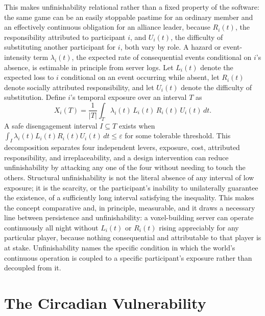 This makes unfinishability relational rather than a fixed property of the software: the same game can be an easily stoppable pastime for an ordinary member and an effectively continuous obligation for an alliance leader, because $R_i(t)$, the responsibility attributed to participant $i$, and $U_i(t)$, the difficulty of substituting another participant for $i$, both vary by role. A hazard or event-intensity term $\lambda_i(t)$, the expected rate of consequential events conditional on $i$'s absence, is estimable in principle from server logs. Let $L_i(t)$ denote the expected loss to $i$ conditional on an event occurring while absent, let $R_i(t)$ denote socially attributed responsibility, and let $U_i(t)$ denote the difficulty of substitution. Define $i$'s temporal exposure over an interval $T$ as
\[
X_i(T) = \frac{1}{|T|} \int_T \lambda_i(t)\, L_i(t)\, R_i(t)\, U_i(t)\, dt.
\]
A safe disengagement interval $I \subseteq T$ exists when $\int_I \lambda_i(t) L_i(t) R_i(t) U_i(t)\, dt \leq \varepsilon$ for some tolerable threshold. This decomposition separates four independent levers, exposure, cost, attributed responsibility, and irreplaceability, and a design intervention can reduce unfinishability by attacking any one of the four without needing to touch the others. Structural unfinishability is not the literal absence of any interval of low exposure; it is the scarcity, or the participant's inability to unilaterally guarantee the existence, of a sufficiently long interval satisfying the inequality. This makes the concept comparative and, in principle, measurable, and it draws a necessary line between persistence and unfinishability: a voxel-building server can operate continuously all night without $L_i(t)$ or $R_i(t)$ rising appreciably for any particular player, because nothing consequential and attributable to that player is at stake. Unfinishability names the specific condition in which the world's continuous operation is coupled to a specific participant's exposure rather than decoupled from it.

\section{The Circadian Vulnerability}

